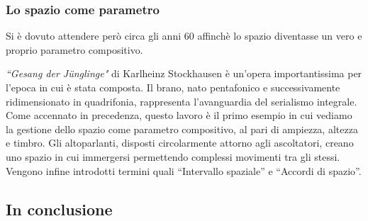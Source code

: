 \subsubsection{Lo spazio come parametro}
Si è dovuto attendere però circa gli anni 60 affinchè lo spazio diventasse un vero e proprio parametro compositivo.

\emph{“Gesang der Jünglinge"} di Karlheinz Stockhausen è un’opera importantissima per l’epoca in cui è stata composta. Il brano, nato pentafonico e successivamente ridimensionato in quadrifonia, rappresenta l’avanguardia del serialismo integrale. Come accennato in precedenza, questo lavoro è il primo esempio in cui vediamo la gestione dello spazio come parametro compositivo, al pari di ampiezza, altezza e timbro.
Gli altoparlanti, disposti circolarmente attorno agli ascoltatori, creano uno spazio in cui immergersi permettendo complessi movimenti tra gli stessi.
Vengono infine introdotti termini quali “Intervallo spaziale” e “Accordi di spazio”.
\subsection{In conclusione}